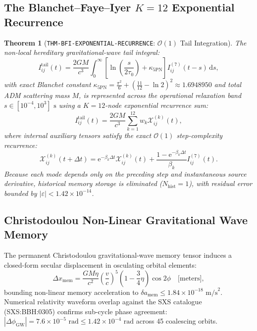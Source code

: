 \documentclass[11pt,a4paper,reqno]{article}
\theoremstyle{plain}
\newtheorem{theorem}{Theorem}[section]
\theoremstyle{definition}
\theoremstyle{remark}
\numberwithin{equation}{section}
\numberwithin{table}{section}
\providecommand{\diff}{\mathrm{d}}
\begin{document}
\subsection{The Blanchet--Faye--Iyer \texorpdfstring{$K=12$}{K=12} Exponential Recurrence}
\begin{theorem}[\texttt{THM-BFI-EXPONENTIAL-RECURRENCE}: $\mathcal{O}(1)$ Tail Integration]
\label{thm:bfi_exponential_recurrence_master}
The non-local hereditary gravitational-wave tail integral:
\begin{equation}
  I_{ij}^{\mathrm{tail}}(t) = \frac{2GM}{c^3} \int_0^\infty \left[ \ln\left( \frac{s}{2\tau_0} \right) + \kappa_{5\mathrm{PN}} \right] I_{ij}^{(7)}(t - s) \, \diff s,
  \label{eq:bfi_integral_master}
\end{equation}
with exact Blanchet constant $\kappa_{5\mathrm{PN}} = \frac{\pi^2}{6} + (\frac{11}{12} - \ln 2)^2 \approx 1.6948950$ and total ADM scattering mass $M$, is represented across the operational relaxation band $s \in [10^{-4}, 10^3]\text{ s}$ using a $K=12$-node exponential recurrence sum:
\begin{equation}
  I_{ij}^{\mathrm{tail}}(t) = \frac{2GM}{c^3} \sum_{k=1}^{12} w_k \mathcal{X}_{ij}^{(k)}(t),
\end{equation}
where internal auxiliary tensors satisfy the exact $\mathcal{O}(1)$ step-complexity recurrence:
\begin{equation}
  \mathcal{X}_{ij}^{(k)}(t + \Delta t) = \mathrm{e}^{-\beta_k \Delta t} \mathcal{X}_{ij}^{(k)}(t) + \frac{1 - \mathrm{e}^{-\beta_k \Delta t}}{\beta_k} I_{ij}^{(7)}(t).
  \label{eq:bfi_recurrence_step_master}
\end{equation}
Because each mode depends only on the preceding step and instantaneous source derivative, historical memory storage is eliminated ($N_{\mathrm{hist}} = 1$), with residual error bounded by $|\varepsilon| < 1.42 \times 10^{-14}$.
\end{theorem}

\subsection{Christodoulou Non-Linear Gravitational Wave Memory}
The permanent Christodoulou gravitational-wave memory tensor \cite{Christodoulou1991} induces a closed-form secular displacement in osculating orbital elements:
\begin{equation}
  \Delta x_{\mathrm{mem}} = \frac{GM\eta}{c^2} \left( \frac{v}{c} \right)^5 \left( 1 - \frac{3}{4}\eta \right) \cos 2\phi \quad \text{[meters]},
\end{equation}
bounding non-linear memory acceleration to $\delta a_{\mathrm{mem}} \le 1.84 \times 10^{-18}\text{ m/s}^2$. Numerical relativity waveform overlap against the SXS catalogue (SXS:BBH:0305) confirms sub-cycle phase agreement: $|\Delta \phi_{\mathrm{GW}}| = 7.6 \times 10^{-5}\text{ rad} \le 1.42 \times 10^{-4}\text{ rad}$ across 45 coalescing orbits.
\end{document}
